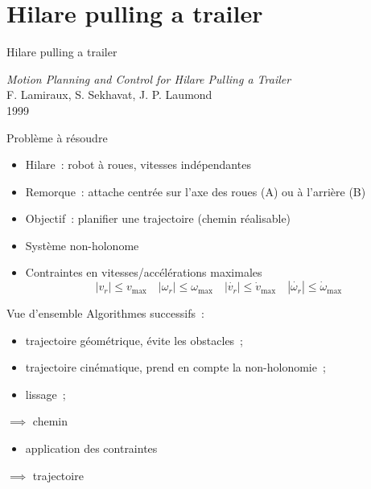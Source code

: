 \documentclass[11pt]{beamer}
\newcommand{\abs}[1]{\left\vert{} #1 \right\vert{}}
\begin{document}

\section{\og{}Hilare pulling a trailer~\fg}

\begin{frame}{Hilare pulling a trailer}
	\begin{centering}
		\textit{\Large Motion Planning and Control for Hilare Pulling a
		Trailer} \\
		\vspace{1em}
		{F. Lamiraux, S. Sekhavat, J. P. Laumond} \\
		\vspace{1em}
		1999 \\
	\end{centering}
\end{frame}

\begin{frame}{Problème à résoudre}
	\begin{itemize}
		\item Hilare~: robot à roues, vitesses indépendantes
		\item Remorque~: attache centrée sur l'axe des roues (A) ou à l'arrière
			(B)
		\item Objectif~: planifier une trajectoire (chemin réalisable)
		\item Système non-holonome
		\item Contraintes en vitesses/accélérations maximales
			\[ \abs{v_r} \leq v_{\max} \quad
			\abs{\omega_r} \leq \omega_{\max} \quad
			\abs{\dot{v_r}} \leq \dot{v}_{\max} \quad
			\abs{\dot{\omega_r}} \leq \dot{\omega}_{\max} \]
	\end{itemize}
\end{frame}

\begin{frame}{Vue d'ensemble}
	Algorithmes successifs~:
	\begin{itemize}
		\item trajectoire \alert{géométrique}, évite les obstacles~;
			\pause{}
		\item trajectoire \alert{cinématique}, prend en compte la
			non-holonomie~;
			\pause{}
		\item lissage~;
	\end{itemize}
	\hspace{2cm}\alert{$\implies$ chemin}
			\pause{}
	\begin{itemize}
		\item application des contraintes
	\end{itemize}
	\hspace{2cm}\alert{$\implies$ trajectoire}
\end{frame}
\end{document}
